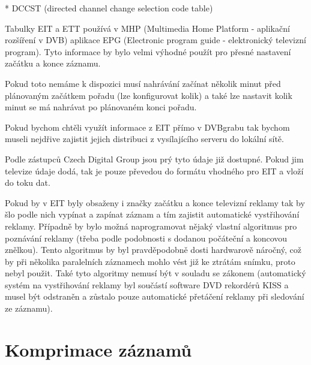 * DCCST (directed channel change selection code table)

\vspace{10pt}

Tabulky EIT a ETT používá v MHP (Multimedia Home Platform - aplikační rozšíření v DVB) aplikace EPG (Electronic program guide - elektronický televizní program). Tyto informace by bylo velmi výhodné použít pro přesné nastavení začátku a konce záznamu.

\vspace{10pt}

Pokud toto nemáme k dispozici musí nahrávání začínat několik minut před plánovaným začátkem pořadu (lze konfigurovat kolik) a také lze nastavit kolik minut se má nahrávat po plánovaném konci pořadu.

\vspace{10pt}

Pokud bychom chtěli využít informace z EIT přímo v DVBgrabu tak bychom museli nejdřive zajistit jejich distribuci z vysílajícího serveru do lokální sítě.

\vspace{10pt}

Podle zástupců Czech Digital Group jsou prý tyto údaje již dostupné. Pokud jim televize údaje dodá, tak je pouze převedou do formátu vhodného pro EIT a vloží do toku dat.

\vspace{10pt}

Pokud by v EIT byly obsaženy i značky začátku a konce televizní reklamy tak by šlo podle nich vypínat a zapínat záznam a tím zajistit automatické vystřihování reklamy. Případně by bylo možná naprogramovat nějaký vlastní algoritmus pro poznávání reklamy (třeba podle podobnosti s dodanou počáteční a koncovou znělkou). Tento algoritmus by byl pravděpodobně dosti hardwarově náročný, což by při několika paralelních záznamech mohlo vést již ke ztrátám snímku, proto nebyl použit. Také tyto algoritmy nemusí být v souladu se zákonem (automatický systém na vystřihování reklamy byl součástí software DVD rekordérů KISS a musel být odstraněn a zůstalo pouze automatické přetáčení reklamy při sledování ze záznamu).

\section{Komprimace záznamů}

